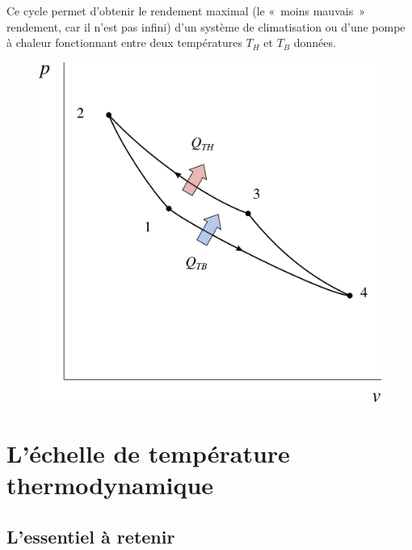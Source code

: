 		Ce cycle permet d’obtenir le rendement maximal (le «~moins mauvais~» rendement, car il n’est pas infini) d’un système de climatisation ou d’une pompe à chaleur fonctionnant entre deux températures $T_H$ et $T_B$ données.

		\begin{figure}
			\begin{center}
				\includegraphics[width=\didacticpvdiagramwidth]{images/carnot_pv_gp_refrigerateur.png}
			\end{center}
			\label{fig_p-v_gp_carnot_inversé}
		\end{figure}


\section{L’échelle de température thermodynamique}


	\subsection{L’essentiel à retenir}
	
